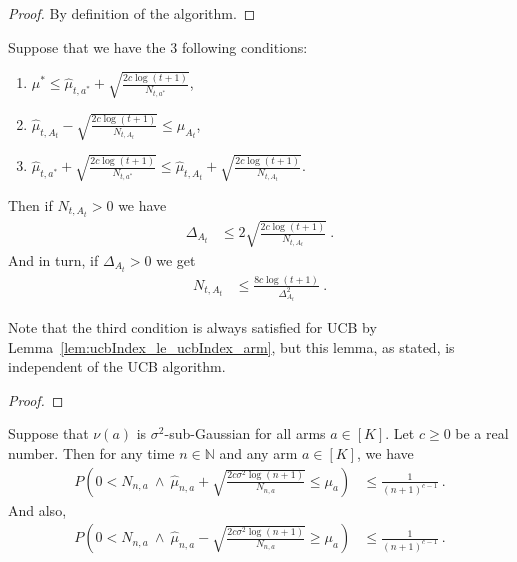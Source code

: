 \begin{proof}\leanok
By definition of the algorithm.
\end{proof}


\begin{lemma}\label{lem:gap_arm_le_two_mul_ucbWidth}
  \leanok
Suppose that we have the 3 following conditions:
\begin{enumerate}
  \item $\mu^* \le \hat{\mu}_{t, a^*} + \sqrt{\frac{2 c \log(t + 1)}{N_{t,a^*}}}$,
  \item $\hat{\mu}_{t,A_t} - \sqrt{\frac{2 c \log(t + 1)}{N_{t,A_t}}} \le \mu_{A_t}$,
  \item $\hat{\mu}_{t, a^*} + \sqrt{\frac{2 c \log(t + 1)}{N_{t,a^*}}} \le \hat{\mu}_{t,A_t} + \sqrt{\frac{2 c \log(t + 1)}{N_{t,A_t}}}$.
\end{enumerate}
Then if $N_{t,A_t} > 0$ we have
\begin{align*}
  \Delta_{A_t}
  &\le 2 \sqrt{\frac{2 c \log(t + 1)}{N_{t,A_t}}}
  \: .
\end{align*}
And in turn, if $\Delta_{A_t} > 0$ we get
\begin{align*}
  N_{t,A_t}
  &\le \frac{8 c \log(t + 1)}{\Delta_{A_t}^2}
  \: .
\end{align*}

Note that the third condition is always satisfied for UCB by Lemma~\ref{lem:ucbIndex_le_ucbIndex_arm}, but this lemma, as stated, is independent of the UCB algorithm.
\end{lemma}

\begin{proof}\leanok

\end{proof}


\begin{lemma}\label{lem:prob_ucbIndex_le}
  \leanok
Suppose that $\nu(a)$ is $\sigma^2$-sub-Gaussian for all arms $a \in [K]$.
Let $c \ge 0$ be a real number.
Then for any time $n \in \mathbb{N}$ and any arm $a \in [K]$, we have
\begin{align*}
  P\left(0 < N_{n, a} \ \wedge \ \hat{\mu}_{n, a} + \sqrt{\frac{2 c \sigma^2 \log(n + 1)}{N_{n,a}}} \le \mu_a\right)
  &\le \frac{1}{(n + 1)^{c - 1}}
  \: .
\end{align*}
And also,
\begin{align*}
  P\left(0 < N_{n, a} \ \wedge \ \hat{\mu}_{n, a} - \sqrt{\frac{2 c \sigma^2 \log(n + 1)}{N_{n,a}}} \ge \mu_a\right)
  &\le \frac{1}{(n + 1)^{c - 1}}
  \: .
\end{align*}
\end{lemma}

